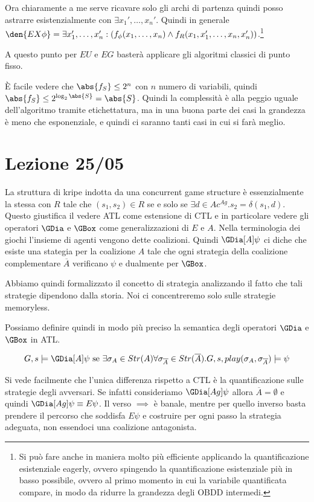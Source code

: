Ora chiaramente a me serve ricavare solo gli archi di partenza quindi posso astrarre esistenzialmente con \(\exists x_1', \ldots,x_n'\). Quindi in generale \(\den{EX\phi}= \exists x_1',\ldots,x_n': (f_{\phi}(x_1,\ldots,x_n)\land f_{R}(x_1,x_1',\ldots,x_n,x_n'))\).\footnote{Si può fare anche in maniera molto più efficiente applicando la quantificazione esistenziale eagerly, ovvero spingendo la quantificazione esistenziale più in basso possibile, ovvero al primo momento in cui la variabile quantificata compare, in modo da ridurre la grandezza degli OBDD intermedi.}

A questo punto per \(EU\) e \(EG\) basterà applicare gli algoritmi classici di punto fisso.

È facile vedere che \(\abs{f_S}\leq 2^n\) con \(n\) numero di variabili, quindi \(\abs{f_S}\leq 2^{\log_2 \abs{S}} = \abs{S}\). Quindi la complessità è alla peggio uguale dell'algoritmo tramite etichettatura, ma in una buona parte dei casi la grandezza è meno che esponenziale, e quindi ci saranno tanti casi in cui si farà meglio.

\chapter{Lezione 25/05}

La struttura di kripe indotta da una concurrent game structure è essenzialmente la stessa con \(R\) tale che \((s_1,s_2) \in R\) se e solo se \(\exists d \in Ac^{Ag}. s_2 = \delta(s_1,d)\). Questo giustifica il vedere ATL come estensione di CTL e in particolare vedere gli operatori \(\GDia\) e \(\GBox\) come generalizzazioni di \(E\) e \(A\). Nella terminologia dei giochi l'insieme di agenti vengono dette coalizioni. Quindi \(\GDia[A] \psi\) ci diche che esiste una stategia per la coalizione \(A\) tale che ogni strategia della coalizione complementare \(\overline{A}\) verificano \(\psi\) e dualmente per \(\GBox\).

Abbiamo quindi formalizzato il concetto di strategia analizzando il fatto che tali strategie dipendono dalla storia. Noi ci concentreremo solo sulle strategie memoryless.

Possiamo definire quindi in modo più preciso la semantica degli operatori \(\GDia\) e \(\GBox\) in ATL\@.

\[G,s\models \GDia[A] \psi \text{ se } \exists \sigma_A \in Str(A) \forall \sigma_{\overline{A}} \in Str(\overline{A}). G,s,play(\sigma_A,\sigma_{\overline{A}})\models \psi \]

Si vede facilmente che l'unica differenza rispetto a CTL è la quantificazione sulle strategie degli avversari. Se infatti consideriamo \(\GDia[Ag] \psi\) allora \(\overline{A} = \emptyset\) e quindi \(\GDia[Ag] \psi\equiv E\psi\). Il verso \(\implies\) è banale, mentre per quello inverso basta prendere il percorso che soddisfa \(E\psi\) e costruire per ogni passo la strategia adeguata, non essendoci una coalizione antagonista.

